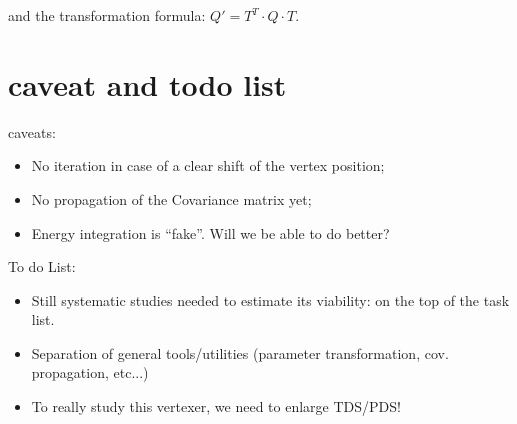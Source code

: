 \documentclass[12pt,final]{article}
\begin{document}
\noindent and the transformation formula: $\displaystyle{Q' = T^T\cdot Q\cdot T}$.




\section{caveat and todo list}
caveats:
\begin{itemize}
\item No iteration in case of a clear shift of the vertex position;
\item No propagation of the Covariance matrix yet;
\item Energy integration is ``fake''. Will we be able to do better?
\end{itemize}
To do List:
\begin{itemize}
\item Still systematic studies needed to estimate its viability: on the top of the task list.
\item Separation of general tools/utilities (parameter transformation, cov. propagation, etc...)
\item To really study this vertexer, we need to enlarge TDS/PDS! 
\end{itemize}
\end{document}
